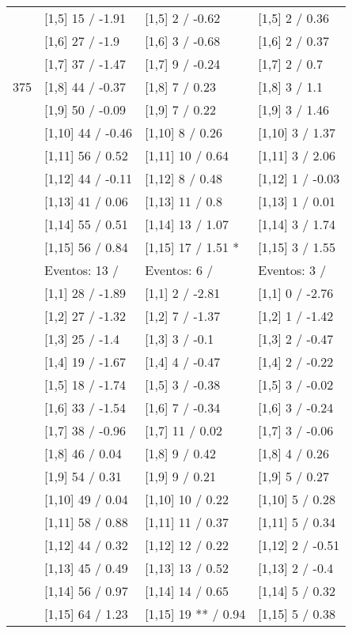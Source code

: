 \begin{table}
\begin{tabular}[t]{llll}
 & {}[1,5] 15  / -1.91 & {}[1,5] 2  / -0.62 & {}[1,5] 2  / 0.36\\
 & {}[1,6] 27  / -1.9 & {}[1,6] 3  / -0.68 & {}[1,6] 2  / 0.37\\
 & {}[1,7] 37  / -1.47 & {}[1,7] 9  / -0.24 & {}[1,7] 2  / 0.7\\
375 & {}[1,8] 44  / -0.37 & {}[1,8] 7  / 0.23 & {}[1,8] 3  / 1.1\\
\addlinespace
 & {}[1,9] 50  / -0.09 & {}[1,9] 7  / 0.22 & {}[1,9] 3  / 1.46\\
 & {}[1,10] 44  / -0.46 & {}[1,10] 8  / 0.26 & {}[1,10] 3  / 1.37\\
 & {}[1,11] 56  / 0.52 & {}[1,11] 10  / 0.64 & {}[1,11] 3  / 2.06\\
 & {}[1,12] 44  / -0.11 & {}[1,12] 8  / 0.48 & {}[1,12] 1  / -0.03\\
 & {}[1,13] 41  / 0.06 & {}[1,13] 11  / 0.8 & {}[1,13] 1  / 0.01\\
\addlinespace
 & {}[1,14] 55  / 0.51 & {}[1,14] 13  / 1.07 & {}[1,14] 3  / 1.74\\
 & {}[1,15] 56  / 0.84 & {}[1,15] 17  / 1.51 * & {}[1,15] 3  / 1.55\\
 & Eventos:  13 / & Eventos:  6 / & Eventos:  3 /\\
 & {}[1,1] 28  / -1.89 & {}[1,1] 2  / -2.81 & {}[1,1] 0  / -2.76\\
 & {}[1,2] 27  / -1.32 & {}[1,2] 7  / -1.37 & {}[1,2] 1  / -1.42\\
\addlinespace
 & {}[1,3] 25  / -1.4 & {}[1,3] 3  / -0.1 & {}[1,3] 2  / -0.47\\
 & {}[1,4] 19  / -1.67 & {}[1,4] 4  / -0.47 & {}[1,4] 2  / -0.22\\
 & {}[1,5] 18  / -1.74 & {}[1,5] 3  / -0.38 & {}[1,5] 3  / -0.02\\
 & {}[1,6] 33  / -1.54 & {}[1,6] 7  / -0.34 & {}[1,6] 3  / -0.24\\
 & {}[1,7] 38  / -0.96 & {}[1,7] 11  / 0.02 & {}[1,7] 3  / -0.06\\
\addlinespace
500 & {}[1,8] 46  / 0.04 & {}[1,8] 9  / 0.42 & {}[1,8] 4  / 0.26\\
 & {}[1,9] 54  / 0.31 & {}[1,9] 9  / 0.21 & {}[1,9] 5  / 0.27\\
 & {}[1,10] 49  / 0.04 & {}[1,10] 10  / 0.22 & {}[1,10] 5  / 0.28\\
 & {}[1,11] 58  / 0.88 & {}[1,11] 11  / 0.37 & {}[1,11] 5  / 0.34\\
 & {}[1,12] 44  / 0.32 & {}[1,12] 12  / 0.22 & {}[1,12] 2  / -0.51\\
\addlinespace
 & {}[1,13] 45  / 0.49 & {}[1,13] 13  / 0.52 & {}[1,13] 2  / -0.4\\
 & {}[1,14] 56  / 0.97 & {}[1,14] 14  / 0.65 & {}[1,14] 5  / 0.32\\
 & {}[1,15] 64  / 1.23 & {}[1,15] 19 ** / 0.94 & {}[1,15] 5  / 0.38\\
\bottomrule
\end{tabular}
\end{table}

